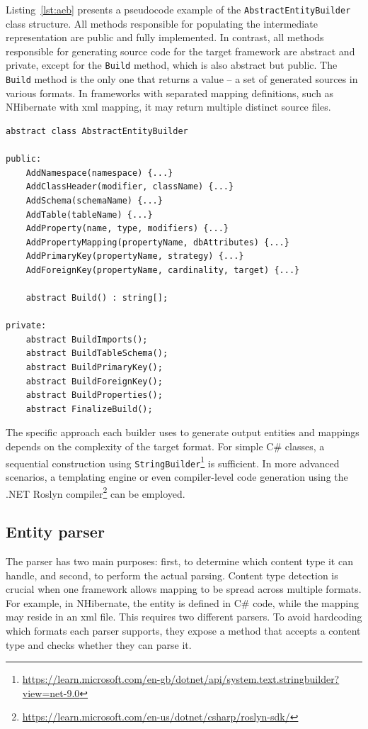Listing~\ref{lst:aeb} presents a pseudocode example of the \texttt{AbstractEntityBuilder} class structure. All methods responsible for populating the intermediate representation are public and fully implemented. In contrast, all methods responsible for generating source code for the target framework are abstract and private, except for the \texttt{Build} method, which is also abstract but public. The \texttt{Build} method is the only one that returns a value -- a set of generated sources in various formats. In frameworks with separated mapping definitions, such as NHibernate with \acrshort{xml} mapping, it may return multiple distinct source files. 

 \begin{lstlisting}[caption={AbstractEntityBuilder class structure}, language=pseudo, label={lst:aeb}]
abstract class AbstractEntityBuilder
    
public: 
    AddNamespace(namespace) {...}
    AddClassHeader(modifier, className) {...}
    AddSchema(schemaName) {...}
    AddTable(tableName) {...}
    AddProperty(name, type, modifiers) {...}
    AddPropertyMapping(propertyName, dbAttributes) {...}
    AddPrimaryKey(propertyName, strategy) {...}
    AddForeignKey(propertyName, cardinality, target) {...}
    
    abstract Build() : string[];

private: 
    abstract BuildImports();
    abstract BuildTableSchema();
    abstract BuildPrimaryKey();
    abstract BuildForeignKey();
    abstract BuildProperties();
    abstract FinalizeBuild();
 \end{lstlisting}

 The specific approach each builder uses to generate output entities and mappings depends on the complexity of the target format. For simple C\# classes, a sequential construction using \texttt{StringBuilder}\footnote{\url{https://learn.microsoft.com/en-gb/dotnet/api/system.text.stringbuilder?view=net-9.0}} is sufficient. In more advanced scenarios, a templating engine or even compiler-level code generation using the .NET Roslyn compiler\footnote{\url{https://learn.microsoft.com/en-us/dotnet/csharp/roslyn-sdk/}} can be employed.

\subsection{Entity parser}
The parser has two main purposes: first, to determine which content type it can handle, and second, to perform the actual parsing. Content type detection is crucial when one framework allows mapping to be spread across multiple formats. For example, in NHibernate, the entity is defined in C\# code, while the mapping may reside in an \acrshort{xml} file. This requires two different parsers. To avoid hardcoding which formats each parser supports, they expose a method that accepts a content type and checks whether they can parse it.

